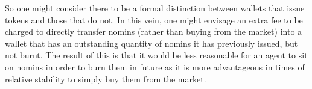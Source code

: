 \noindent So one might consider there to be a formal distinction between wallets that issue tokens and those that do not. In this vein, one might envisage an extra fee to be charged to directly transfer nomins (rather than buying from the market) into a wallet that has an outstanding quantity of nomins it has previously issued, but not burnt. The result of this is that it would be less reasonable for an agent to sit on nomins in order to burn them in future as it is more advantageous in times of relative stability to simply buy them from the market. \\

\pagebreak